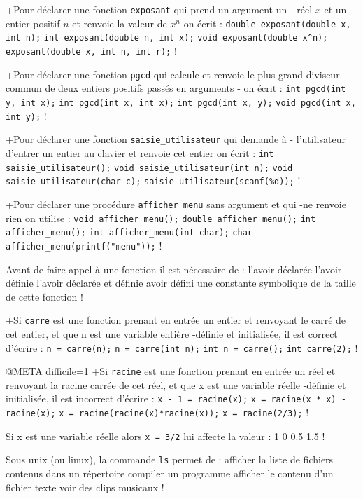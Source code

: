 +Pour déclarer une fonction \verb|exposant| qui prend un argument un
- réel $x$ et un entier positif $n$ et renvoie la valeur de $x^n$ on écrit :
 \verb|double exposant(double x, int n);|
 \verb|int exposant(double n, int x);|
 \verb|void exposant(double x^n);|
 \verb|exposant(double x, int n, int r);|
!

+Pour déclarer une fonction \verb|pgcd| qui calcule et renvoie le plus
  grand diviseur commun de deux entiers positifs passés en arguments 
- on écrit : 
 \verb|int pgcd(int y, int x);|
 \verb|int pgcd(int x, int x);|
 \verb|int pgcd(int x, y);|
 \verb|void pgcd(int x, int y);|
!

+Pour déclarer une fonction \verb|saisie_utilisateur| qui demande à
- l'utilisateur d'entrer un entier au clavier et renvoie cet entier on écrit :
 \verb|int saisie_utilisateur();|
 \verb|void saisie_utilisateur(int n);|
 \verb|void saisie_utilisateur(char c);|
 \verb|saisie_utilisateur(scanf(%d));|
!


+Pour déclarer une procédure \verb|afficher_menu| sans argument et qui
-ne renvoie rien on utilise :
 \verb|void afficher_menu();|
 \verb|double afficher_menu();|
 \verb|int afficher_menu();|
 \verb|int afficher_menu(int char);|
 \verb|char afficher_menu(printf("menu"));|
!

Avant de faire appel à une fonction il est nécessaire de :
 l'avoir déclarée
 l'avoir définie
 l'avoir déclarée et définie
 avoir défini une constante symbolique de la taille de cette fonction
!

+Si \verb|carre| est une fonction prenant en entrée un entier et
 renvoyant le carré de cet entier, et que n est une variable entière
-définie et initialisée, il est correct d'écrire :
 \verb+n = carre(n);+
 \verb+n = carre(int n);+
 \verb+int n = carre();+
 \verb+int carre(2);+
!

@META difficile=1
+Si \verb|racine| est une fonction prenant en entrée un réel et
 renvoyant la racine carrée de cet réel, et que x est une variable réelle
-définie et initialisée, il est incorrect d'écrire :
 \verb+x - 1 = racine(x);+
 \verb+x = racine(x * x) - racine(x);+
 \verb+x = racine(racine(x)*racine(x));+
 \verb+x = racine(2/3);+
!

Si x est une variable réelle alors \verb|x = 3/2| lui affecte la valeur :
  1
  0
  0.5
  1.5
!

Sous unix (ou linux), la commande \verb|ls| permet de :
 afficher la liste de fichiers contenus dans un répertoire
 compiler un programme
 afficher le contenu d'un fichier texte
 voir des clips musicaux
!

